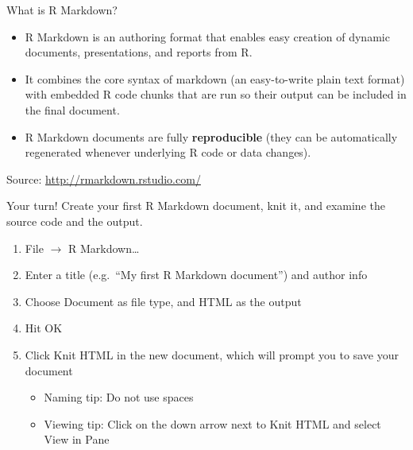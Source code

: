 \documentclass[
  ignorenonframetext,
]{beamer}
\providecommand{\tightlist}{%
  \setlength{\itemsep}{0pt}\setlength{\parskip}{0pt}}
\begin{document}
\begin{frame}{What is R Markdown?}
\protect\hypertarget{what-is-r-markdown}{}
\begin{itemize}
\item
  R Markdown is an authoring format that enables easy creation of
  dynamic documents, presentations, and reports from R.
\item
  It combines the core syntax of markdown (an easy-to-write plain text
  format) with embedded R code chunks that are run so their output can
  be included in the final document.
\item
  R Markdown documents are fully \textbf{reproducible} (they can be
  automatically regenerated whenever underlying R code or data changes).
\end{itemize}

Source: \url{http://rmarkdown.rstudio.com/}
\end{frame}

\begin{frame}{Your turn!}
\protect\hypertarget{your-turn}{}
Create your first R Markdown document, knit it, and examine the source
code and the output.

\begin{enumerate}
\item
  File \(\rightarrow\) R Markdown\ldots{}
\item
  Enter a title (e.g.~``My first R Markdown document'') and author info
\item
  Choose Document as file type, and HTML as the output
\item
  Hit OK
\item
  Click Knit HTML in the new document, which will prompt you to save
  your document

  \begin{itemize}
  \tightlist
  \item
    Naming tip: Do not use spaces
  \item
    Viewing tip: Click on the down arrow next to Knit HTML and select
    View in Pane
  \end{itemize}
\end{enumerate}
\end{frame}
\end{document}
